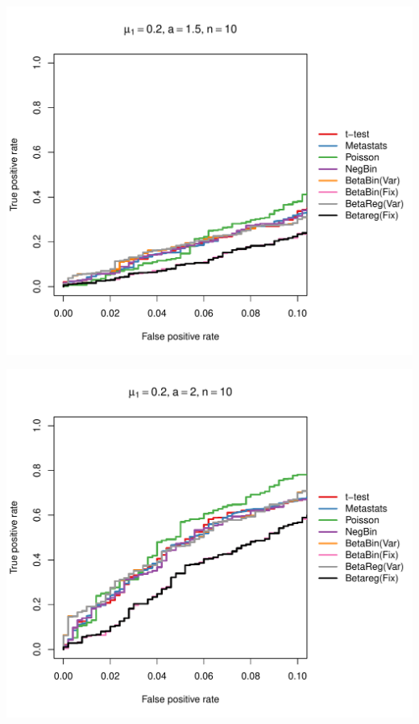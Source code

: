 \documentclass[12pt]{article}\usepackage{graphicx, color}
\makeatletter
\def\maxwidth{ %
  \ifdim\Gin@nat@width>\linewidth
    \linewidth
  \else
    \Gin@nat@width
  \fi
}
\newenvironment{knitrout}{}{} %
\makeatother
\begin{document}
\begin{knitrout}
{\centering \includegraphics[width=\maxwidth]{figure/rocs49} 

}




{\centering \includegraphics[width=\maxwidth]{figure/rocs50} 

}





\end{knitrout}
\end{document}
